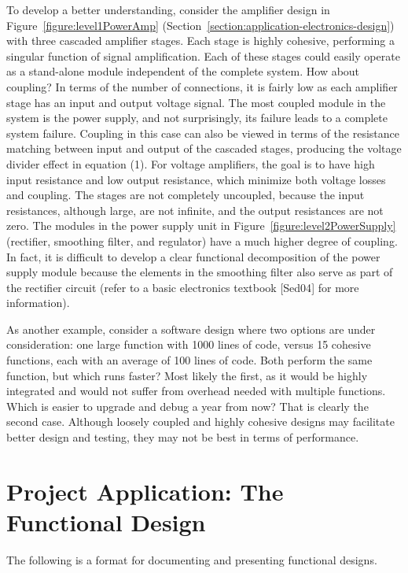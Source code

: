 To develop a better understanding, consider the amplifier design in
Figure~\ref{figure:level1PowerAmp}
(Section~\ref{section:application-electronics-design}) 
with three cascaded amplifier stages. Each
stage is highly cohesive, performing a singular function of signal
amplification. Each of these stages could easily operate as a
stand-alone module independent of the complete system. How about
coupling? In terms of the number of connections, it is fairly low as
each amplifier stage has an input and output voltage signal. The most
coupled module in the system is the power supply, and not surprisingly,
its failure leads to a complete system failure. Coupling in this case
can also be viewed in terms of the resistance matching between input and
output of the cascaded stages, producing the voltage divider effect in
equation (1). For voltage amplifiers, the goal is to have high input
resistance and low output resistance, which minimize both voltage losses
and coupling. The stages are not completely uncoupled, because the input
resistances, although large, are not infinite, and the output
resistances are not zero. The modules in the power supply unit in 
Figure~\ref{figure:level2PowerSupply}
(rectifier, smoothing filter, and regulator) have a much higher
degree of coupling. In fact, it is difficult to develop a clear
functional decomposition of the power supply module because the elements
in the smoothing filter also serve as part of the rectifier circuit
(refer to a basic electronics textbook {[}Sed04{]} for more
information).

As another example, consider a software design where two options are
under consideration: one large function with 1000 lines of code, versus
15 cohesive functions, each with an average of 100 lines of code. Both
perform the same function, but which runs faster? Most likely the first,
as it would be highly integrated and would not suffer from overhead
needed with multiple functions. Which is easier to upgrade and debug a
year from now? That is clearly the second case. Although loosely coupled
and highly cohesive designs may facilitate better design and testing,
they may not be best in terms of performance.

\section{Project Application: The Functional Design}
\label{section:project-application-the-functional-design}

The following is a format for documenting and presenting functional
designs.


